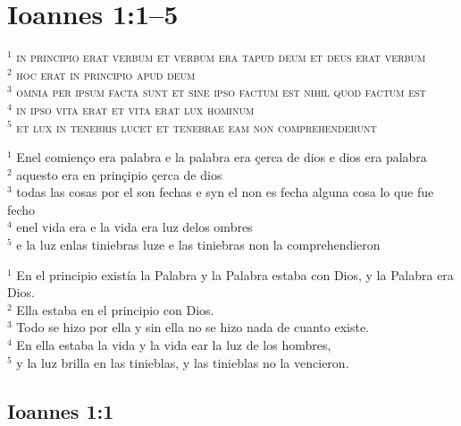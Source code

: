 \documentclass{report}[12pt]
\begin{document}
\section{Ioannes 1:1--5}

\begin{tcolorbox}[title=\textsc{Nova Vulgata}]
  \textsc{$^1$ in principio erat verbum et verbum era tapud deum et deus erat verbum} \\
  \textsc{$^2$ hoc erat in principio apud deum} \\
  \textsc{$^3$ omnia per ipsum facta sunt et sine ipso factum est nihil quod factum est} \\
  \textsc{$^4$ in ipso vita erat et vita erat lux hominum} \\
  \textsc{$^5$ et lux in tenebris lucet et tenebrae eam non comprehenderunt} \\
\end{tcolorbox}

\begin{tcolorbox}[title=Evangelios y Epístolas paulinas de Mart\'{i}n de Lucena]
  $^1$ Enel comien\c{c}o era palabra e la palabra era \c{c}erca de dios e dios era palabra \\
  $^2$ aquesto era en prin\c{c}ipio \c{c}erca de dios \\
  $^3$ todas las cosas por el son fechas e syn el non es fecha alguna cosa lo que fue fecho \\
  $^4$ enel vida era e la vida era luz delos ombres \\
  $^5$ e la luz enlas tiniebras luze e las tiniebras non la comprehendieron \\
\end{tcolorbox}

\begin{tcolorbox}[title=La Biblia de Jerusal\'{e}n]
  $^1$ En el principio exist\'{i}a la Palabra y la Palabra estaba con Dios, y la Palabra era Dios. \\
  $^2$ Ella estaba en el principio con Dios. \\
  $^3$ Todo se hizo por ella y sin ella no se hizo nada de cuanto existe. \\
  $^4$ En ella estaba la vida y la vida ear la luz de los hombres, \\
  $^5$ y la luz brilla en las tinieblas, y las tinieblas no la vencieron. \\
\end{tcolorbox}

\subsection{Ioannes 1:1}
\end{document}
